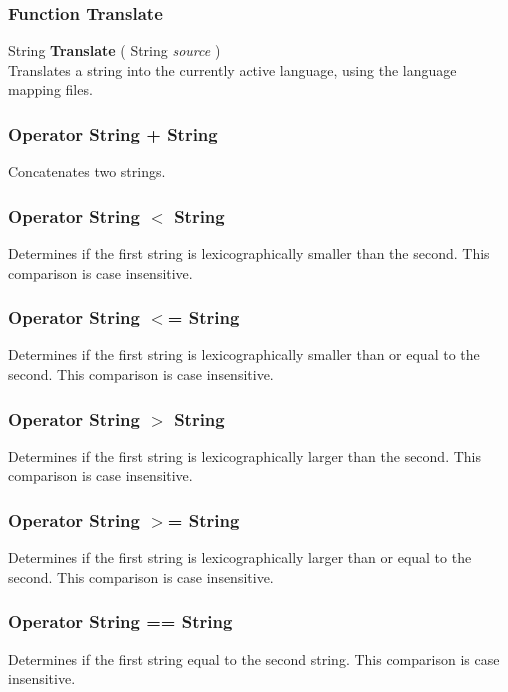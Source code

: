 \documentclass[10pt]{book}
\begin{document}
\subsubsection{Function Translate \label{F:Translate}}
String \textbf{Translate} ( String \textit{source} ) \\
Translates a string into the currently active language, using the language mapping files.

\subsubsection{Operator String + String \label{O:String+String}}
Concatenates two strings.

\subsubsection{Operator String $<$ String \label{O:String<String}}
Determines if the first string is lexicographically smaller than the second. This comparison is case insensitive.

\subsubsection{Operator String $<$= String \label{O:String<=String}}
Determines if the first string is lexicographically smaller than or equal to the second. This comparison is case insensitive.

\subsubsection{Operator String $>$ String \label{O:String>String}}
Determines if the first string is lexicographically larger than the second. This comparison is case insensitive.

\subsubsection{Operator String $>$= String \label{O:String>=String}}
Determines if the first string is lexicographically larger than or equal to the second. This comparison is case insensitive.

\subsubsection{Operator String == String \label{O:String==String}}
Determines if the first string equal to the second string. This comparison is case insensitive.
\end{document}
